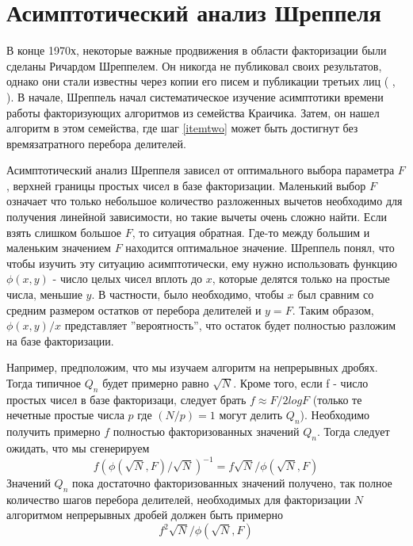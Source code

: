 \documentclass[a4paper,12pt]{report}
\begin{document}
\section{Асимптотический анализ Шреппеля}
В конце 1970х, некоторые важные продвижения в области факторизации были сделаны Ричардом Шреппелем. Он никогда не публиковал своих результатов, однако они стали известны через копии его писем и публикации третьих лиц ( \cite{monier}, \cite{pomer}). В начале, Шреппель начал систематическое изучение асимптотики времени работы факторизующих алгоритмов из семейства Краичика. Затем, он нашел алгоритм в этом семейства, где шаг \ref{itemtwo} может быть достигнут без времязатратного перебора делителей.

Асимптотический анализ Шреппеля зависел от оптимального выбора параметра $F$, верхней границы простых чисел в базе факторизации. Маленький выбор $F$ означает что только небольшое количество разложенных вычетов необходимо для получения линейной зависимости, но такие вычеты очень сложно найти. Если взять слишком большое $F$, то ситуация обратная. Где-то между большим и маленьким значением $F$ находится оптимальное значение. Шреппель понял, что чтобы изучить эту ситуацию асимптотически, ему нужно использовать функцию $\phi(x, y)$ - число целых чисел вплоть до $x$, которые делятся только на простые числа, меньшие $y$. В частности, было необходимо, чтобы $x$ был сравним со средним размером остатков от перебора делителей и  $y = F$. Таким образом, $\phi(x, y)/x$ представляет ''вероятность'', что остаток будет полностью разложим на базе факторизации.

Например, предположим, что мы изучаем алгоритм на непрерывных дробях. Тогда типичное $Q_n$ будет примерно равно $\sqrt{N}$. Кроме того, если f - число простых чисел в базе факторизаци, следует брать $f \approx F/2 logF$ (только те нечетные простые числа $p$ где $(N/p) = 1$ могут делить $Q_n$). Необходимо получить примерно $f$ полностью факторизованных значений $Q_n$. Тогда следует ожидать, что мы сгенерируем 
\begin{equation*}
f(\phi(\sqrt{N}, F)/\sqrt{N})^{-1} = f\sqrt{N}/\phi(\sqrt{N}, F)
\end{equation*} 
Значений $Q_n$ пока достаточно факторизованных значений получено, так полное количество шагов перебора делителей, необходимых для факторизации $N$ алгоритмом непрерывных дробей должен быть примерно
\begin{equation*}
f^2\sqrt{N}/\phi(\sqrt{N}, F)
\end{equation*}
\end{document}
